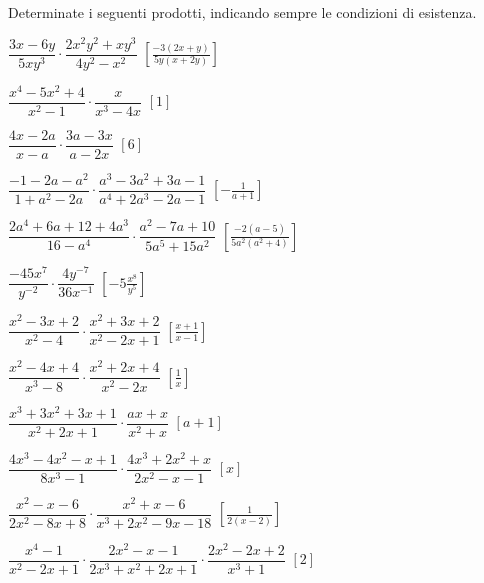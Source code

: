 \begin{esercizio}[\Ast]
\label{ese:19.13}
Determinate i seguenti prodotti, indicando sempre le condizioni di esistenza.
\begin{enumeratea}
 \item $\dfrac{3x-6y}{5xy^{3}}\cdot\dfrac{2x^{2}y^{2}+xy^{3}}{4y^{2}-x^{2}}$
 \hfill $\left[\frac{-{3(2x+y)}}{5y(x+2y)}\right]$
 \item $\dfrac{x^{4}-5x^{2}+4}{x^{2}-1}\cdot\dfrac{x}{x^{3}-4x}$
 \hfill $\left[1\right]$
 \item $\dfrac{4x-2a}{x-a}\cdot\dfrac{3a-3x}{a-2x}$
 \hfill $\left[6\right]$
 \item $\dfrac{-1-2a-a^{2}}{1+a^{2}-2a}\cdot
        \dfrac{a^{3}-3a^{2}+3a-1}{a^{4}+2a^{3}-2a-1}$
 \hfill $\left[-{\frac{1}{a+1}}\right]$
 \item $\dfrac{2a^{4}+6a+12+4a^{3}}{16-a^{4}}\cdot
        \dfrac{a^{2}-7a+10}{5a^{5}+15a^{2}}$
 \hfill $\left[\frac{-{2(a-5)}}{5a^{2}(a^{2}+4)}\right]$
 \item $\dfrac{-45x^{7}}{y^{-2}}\cdot\dfrac{4y^{-7}}{36x^{-1}}$
 \hfill $\left[-5\frac{x^{8}}{y^{5}}\right]$
 \item $\dfrac{x^{2}-3x+2}{x^{2}-4}\cdot\dfrac{x^{2}+3x+2}{x^{2}-2x+1}$
 \hfill $\left[\frac{x+1}{x-1}\right]$
 \item $\dfrac{x^{2}-4x+4}{x^{3}-8}\cdot\dfrac{x^{2}+2x+4}{x^{2}-2x}$
 \hfill $\left[\frac{1}{x}\right]$
 \item $\dfrac{x^{3}+3x^{2}+3x+1}{x^{2}+2x+1}\cdot \dfrac{ax+x}{x^{2}+x}$
 \hfill $\left[a+1\right]$
 \item $\dfrac{4x^{3}-4x^{2}-x+1}{8x^{3}-1}\cdot
        \dfrac{4x^{3}+2x^{2}+x}{2x^{2}-x-1}$
 \hfill $\left[x\right]$
 \item $\dfrac{x^{2}-x-6}{2x^{2}-8x+8}\cdot
        \dfrac{x^{2}+x-6}{x^{3}+2x^{2}-9x-18}$
 \hfill $\left[\frac{1}{2(x-2)}\right]$
 \item $\dfrac{x^{4}-1}{x^{2}-2x+1}\cdot
        \dfrac{2x^{2}-x-1}{2x^{3}+x^{2}+2x+1}\cdot
        \dfrac{2x^{2}-2x+2}{x^{3}+1}$
 \hfill $\left[2\right]$
\end{enumeratea}
\end{esercizio}

\newpage %

